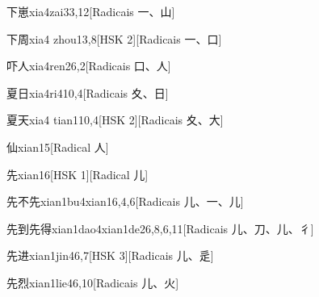 \begin{entry}{下崽}{xia4zai3}{3,12}[Radicais ⼀、⼭]
\end{entry}

\begin{entry}{下周}{xia4 zhou1}{3,8}[HSK 2][Radicais ⼀、⼝]
\end{entry}

\begin{entry}{吓人}{xia4ren2}{6,2}[Radicais ⼝、⼈]
\end{entry}

\begin{entry}{夏日}{xia4ri4}{10,4}[Radicais ⼢、⽇]
\end{entry}

\begin{entry}{夏天}{xia4 tian1}{10,4}[HSK 2][Radicais ⼢、⼤]
\end{entry}

\begin{entry}{仙}{xian1}{5}[Radical ⼈]
\end{entry}

\begin{entry}{先}{xian1}{6}[HSK 1][Radical ⼉]
\end{entry}

\begin{entry}{先不先}{xian1bu4xian1}{6,4,6}[Radicais ⼉、⼀、⼉]
\end{entry}

\begin{entry}{先到先得}{xian1dao4xian1de2}{6,8,6,11}[Radicais ⼉、⼑、⼉、⼻]
\end{entry}

\begin{entry}{先进}{xian1jin4}{6,7}[HSK 3][Radicais ⼉、⾡]
\end{entry}

\begin{entry}{先烈}{xian1lie4}{6,10}[Radicais ⼉、⽕]
\end{entry}

